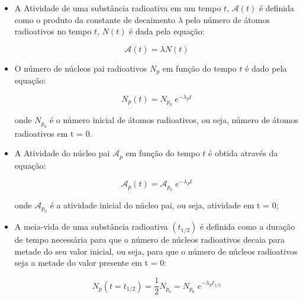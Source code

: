 \documentclass[11pt,a4paper]{article}
\begin{document}
            \begin{itemize}
                \item A Atividade de uma substância radioativa em um tempo $t$, $\mathcal{A}(t)$ é definida como o produto da constante de decaimento $\lambda$ pelo número de átomos radioativos no tempo $t$, $N(t)$ é dada pela equação:

                    \begin{equation}
                        \mathcal{A} (t) = \lambda N(t)
                    \end{equation}

                \item O número de núcleos pai radioativos $N_p$ em função do tempo $t$ é dado pela equação:
                    
                    \begin{equation}
                        N_p(t) = N_{p_0} \; e^{-\lambda_P t}
                    \end{equation}

                    onde $N_{p_0}$ é o número inicial de átomos radioativos, ou seja, número de átomos radioativos em t = 0.

                \item A Atividade do núcleo pai $\mathcal{A}_p$ em função do tempo $t$ é obtida através da equação:
                
                    \begin{equation}
                        \mathcal{A}_p(t) = \mathcal{A}_{p_0} \; e^{-\lambda_P t}
                    \end{equation}
                    
                    onde $\mathcal{A}_{p_0}$ é a atividade inicial do núcleo pai, ou seja, atividade em t = 0;

                \item A meia-vida de uma substância radioativa $(t_{1/2})$ é definida como a duração de tempo necessária para que o número de núcleos radioativos decaia para metade do seu valor inicial, ou seja, para que o número de núcleos radioativos seja a metade do valor presente em t = 0:
                
                    \begin{equation}
                        N_p(t = t_{1/2}) = \frac{1}{2} N_{p_0} = N_{p_0} \; e^{-\lambda_P t_{1/2}}
                    \end{equation}
                

\end{itemize}
\end{document}
